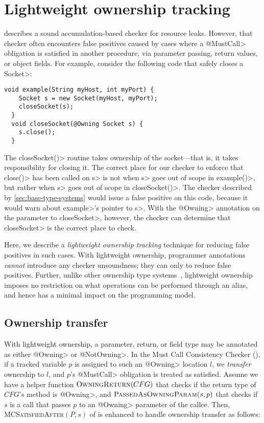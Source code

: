 \section{Lightweight ownership tracking}
\label{sec:lightweight-ownership}

 describes a sound accumulation-based
checker for resource leaks. However, that checker often encounters false
positives caused by cases where a \<@MustCall> obligation is satisfied
in another procedure, via parameter passing, return values, or object fields.
For example, consider the following code that safely closes a \<Socket>:

\begin{lstlisting}[frame=tb,belowskip=3mm]
  void example(String myHost, int myPort) {
    Socket s = new Socket(myHost, myPort);
    closeSocket(s);
  }
  void closeSocket(@Owning Socket s) {
    s.close();
  }  
\end{lstlisting}

The \<closeSocket()> routine takes ownership of the socket---that is,
it takes responsibility for closing it. The correct place for our
checker to enforce that \<close()> has been called on \<s> is not
when \<s> goes out of scope in \<example()>, but rather when \<s>
goes out of scope in \<closeSocket()>. The checker described by
\cref{sec:base-type-systems} would issue a false positive on this
code, because it would warn about \<example>'s pointer to \<s>.
With the \<@Owning> annotation on the parameter to \<closeSocket>,
however, the checker can determine that \<closeSocket> is the correct
place to check.

Here, we describe a \emph{lightweight ownership tracking} technique for reducing
false positives in such cases.  With lightweight ownership, programmer
annotations \emph{cannot} introduce any checker unsoundness; they can only to
reduce false positives.  Further, unlike other ownership type systems~,
lightweight ownership imposes no restriction on what operations can be performed
through an alias, and hence has a minimal impact on the programming model.

\subsection{Ownership transfer}
\label{sec:ownership-transfer}

With lightweight ownership, a parameter, return, or field type may be annotated
as either \<@Owning> or \<@NotOwning>.  In the Must Call Consistency Checker
(), if a tracked variable $p$ is assigned to such an
\<@Owning> location $l$, we \emph{transfer} ownership to $l$, and $p$'s
\<@MustCall> obligation is treated as satisfied. Assume we have a helper
function $\textsc{OwningReturn}(CFG)$ that checks if the return type of $CFG$'s
method is \<@Owning>, and $\textsc{PassedAsOwningParam}(s,p)$ that checks if $s$ is a
call that passes $p$ to an \<@Owning> parameter of the callee.  Then,
\textsc{MCSatisfiedAfter}$(P,s)$ of  is enhanced to handle
ownership transfer as follows:

